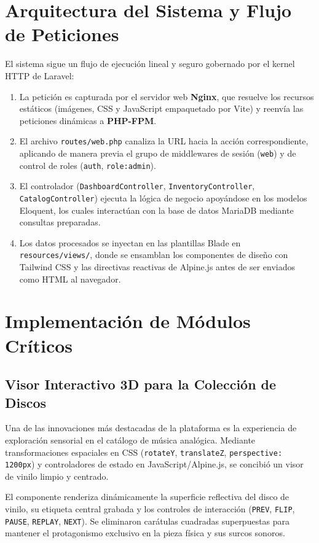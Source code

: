 \section{Arquitectura del Sistema y Flujo de Peticiones}
El sistema sigue un flujo de ejecución lineal y seguro gobernado por el kernel HTTP de Laravel:
\begin{enumerate}
    \item La petición es capturada por el servidor web \textbf{Nginx}, que resuelve los recursos estáticos (imágenes, CSS y JavaScript empaquetado por Vite) y reenvía las peticiones dinámicas a \textbf{PHP-FPM}.
    \item El archivo \texttt{routes/web.php} canaliza la URL hacia la acción correspondiente, aplicando de manera previa el grupo de middlewares de sesión (\texttt{web}) y de control de roles (\texttt{auth}, \texttt{role:admin}).
    \item El controlador (\texttt{DashboardController}, \texttt{InventoryController}, \texttt{CatalogController}) ejecuta la lógica de negocio apoyándose en los modelos Eloquent, los cuales interactúan con la base de datos MariaDB mediante consultas preparadas.
    \item Los datos procesados se inyectan en las plantillas Blade en \texttt{resources/views/}, donde se ensamblan los componentes de diseño con Tailwind CSS y las directivas reactivas de Alpine.js antes de ser enviados como HTML al navegador.
\end{enumerate}

\section{Implementación de Módulos Críticos}

\subsection{Visor Interactivo 3D para la Colección de Discos}
Una de las innovaciones más destacadas de la plataforma es la experiencia de exploración sensorial en el catálogo de música analógica. Mediante transformaciones espaciales en CSS (\texttt{rotateY}, \texttt{translateZ}, \texttt{perspective: 1200px}) y controladores de estado en JavaScript/Alpine.js, se concibió un visor de vinilo limpio y centrado.

El componente renderiza dinámicamente la superficie reflectiva del disco de vinilo, su etiqueta central grabada y los controles de interacción (\texttt{PREV}, \texttt{FLIP}, \texttt{PAUSE}, \texttt{REPLAY}, \texttt{NEXT}). Se eliminaron carátulas cuadradas superpuestas para mantener el protagonismo exclusivo en la pieza física y sus surcos sonoros.

